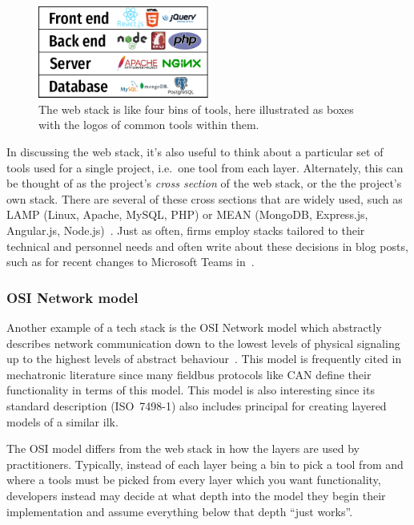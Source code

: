 \documentclass[english,12pt,a4paper,pdftex,eng,utf8]{aaltothesis}
\begin{document}
\begin{figure}[h]
  \centering
  \includegraphics[width=0.5\textwidth]{assets/web_stack}
  \caption{The web stack is like four bins of tools, here illustrated as boxes with the logos of common tools within them.}\label{fig:web_stack}
\end{figure}

In discussing the web stack, it's also useful to think about a particular set of tools used for a single project, i.e.\ one tool from each layer.  Alternately, this can be thought of as the project's {\it cross section\/} of the web stack, or the the project's own stack.  There are several of these cross sections that are widely used, such as LAMP (Linux, Apache, MySQL, PHP) or MEAN (MongoDB, Express.js, Angular.js, Node.js)~\cite{PranamStack2017}.  Just as often, firms employ stacks tailored to their technical and personnel needs and often write about these decisions in blog posts, such as for recent changes to Microsoft Teams in~\cite{Singh2023}.

\subsubsection{OSI Network model}

Another example of a tech stack is the OSI Network model which abstractly describes network communication down to the lowest levels of physical signaling up to the highest levels of abstract behaviour~\cite{ISO7498-1}.  This model is frequently cited in mechatronic literature since many fieldbus protocols like CAN define their functionality in terms of this model.  This model is also interesting since its standard description (ISO~7498-1) also includes principal for creating layered models of a similar ilk.

The OSI model differs from the web stack in how the layers are used by practitioners.  Typically, instead of each layer being a bin to pick a tool from and where a tools must be picked from every layer which you want functionality, developers instead may decide at what depth into the model they begin their implementation and assume everything below that depth ``just works''.
\end{document}
